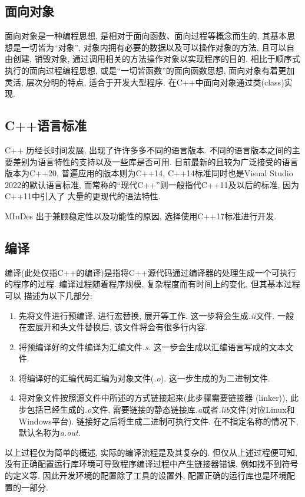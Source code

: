 \subsection{面向对象}
面向对象是一种编程思想, 是相对于面向函数、面向过程等概念而生的, 其基本思想是一切皆为``对象'', 对象内拥有必要的数据以及可以操作对象的方法,
且可以自由创建, 销毁对象, 通过调用相关的方法操作对象以实现程序的目的. 相比于顺序式执行的面向过程编程思想,
或是``一切皆函数''的面向函数思想, 面向对象有着更加灵活, 层次分明的特点, 适合于开发大型程序. 在C++中面向对象通过类(class)实现.

\subsection{C++语言标准}
C++ 历经长时间发展, 出现了许许多多不同的语言版本. 不同的语言版本之间的主要差别为语言特性的支持以及一些库是否可用.
目前最新的且较为广泛接受的语言版本为C++20, 普遍应用的版本则为C++14,
C++14标准同时也是Visual Studio 2022的默认语言标准, 而常称的``现代C++''则一般指代C++11及以后的标准, 因为C++11中引入了
大量的更现代的语法特性.

MInDes 出于兼顾稳定性以及功能性的原因, 选择使用C++17标准进行开发.

\subsection{编译}
编译(此处仅指C++的编译)是指将C++源代码通过编译器的处理生成一个可执行的程序的过程. 编译过程随着程序规模, 复杂程度而有时间上的变化, 但其基本过程可以
描述为以下几部分:
\begin{enumerate}
    \item 先将文件进行预编译, 进行宏替换, 展开等工作. 这一步将会生成\emph{.ii}文件. 一般在宏展开和头文件替换后, 该文件将会有很多行内容.
    \item 将预编译好的文件编译为汇编文件\emph{.s}. 这一步会生成以汇编语言写成的文本文件.
    \item 将编译好的汇编代码汇编为对象文件(\emph{.o}). 这一步生成的为二进制文件.
    \item 将对象文件按照源文件中所述的方式链接起来(此步骤需要链接器 (linker)), 此步包括已经生成的\emph{.o}文件, 需要链接的静态链接库\emph{.a}或者\emph{.lib}文件(对应Linux和Windows平台).
    链接好之后将生成二进制可执行文件. 在不指定名称的情况下, 默认名称为\emph{a.out}.
\end{enumerate}
以上过程仅为简单的概述, 实际的编译流程是及其复杂的. 但仅从上述过程便可知, 没有正确配置运行库环境可导致程序编译过程中产生链接器错误, 例如找不到符号的定义等. 
因此开发环境的配置除了工具的设置外, 配置正确的运行库也是环境配置的一部分.

